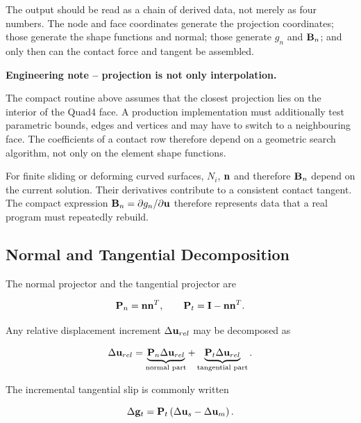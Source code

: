 The output should be read as a chain of derived data, not merely as four
numbers. The node and face coordinates generate the projection coordinates;
those generate the shape functions and normal; those generate $g_n$ and
$\mathbf{B}_n$; and only then can the contact force and tangent be assembled.

\begin{bbox}
\textbf{Engineering note -- projection is not only interpolation.}

The compact routine above assumes that the closest projection lies on the
interior of the Quad4 face. A production implementation must additionally test
parametric bounds, edges and vertices and may have to switch to a neighbouring
face. The coefficients of a contact row therefore depend on a geometric search
algorithm, not only on the element shape functions.
\end{bbox}

For finite sliding or deforming curved surfaces, $N_i$, $\mathbf{n}$ and therefore
$\mathbf{B}_n$ depend on the current solution. Their derivatives contribute to a
consistent contact tangent. The compact expression
$\mathbf{B}_n=\partial g_n/\partial\mathbf{u}$ therefore represents data that a real
program must repeatedly rebuild.

\subsection{Normal and Tangential Decomposition}

The normal projector and the tangential projector are

\begin{equation}
    \mathbf{P}_n = \mathbf{n} \mathbf{n}^T,
    \qquad
    \mathbf{P}_t = \mathbf{I} - \mathbf{n} \mathbf{n}^T.
\end{equation}

Any relative displacement increment $ \Delta \mathbf{u}_{rel} $ may be decomposed as

\begin{equation}
    \Delta \mathbf{u}_{rel}
    = \underbrace{\mathbf{P}_n \Delta \mathbf{u}_{rel}}_{\text{normal part}}
    + \underbrace{\mathbf{P}_t \Delta \mathbf{u}_{rel}}_{\text{tangential part}}.
\end{equation}

The incremental tangential slip is commonly written

\begin{equation}\label{contact-tangential-slip-increment}
    \Delta \mathbf{g}_t =
    \mathbf{P}_t \left( \Delta \mathbf{u}_s - \Delta \mathbf{u}_m \right).
\end{equation}

